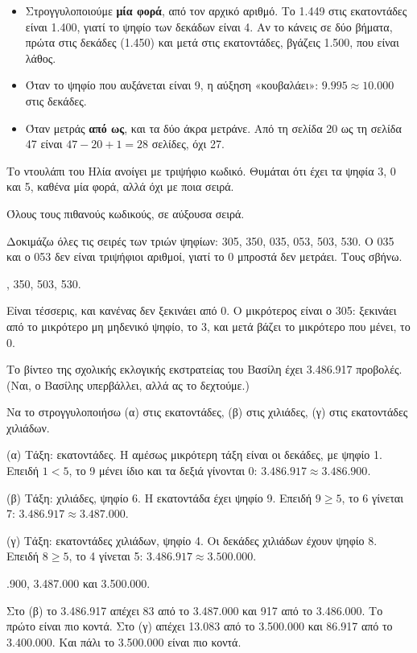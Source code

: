 \begin{prosoxi}
\begin{itemize}[leftmargin=1.2em,itemsep=0.3ex,topsep=2pt]
\item Στρογγυλοποιούμε \textbf{μία φορά}, από τον αρχικό αριθμό. Το 1.449 στις εκατοντάδες είναι 1.400, γιατί το ψηφίο των δεκάδων είναι 4. Αν το κάνεις σε δύο βήματα, πρώτα στις δεκάδες (1.450) και μετά στις εκατοντάδες, βγάζεις 1.500, που είναι λάθος.
\item Όταν το ψηφίο που αυξάνεται είναι 9, η αύξηση «κουβαλάει»: $9.995\approx 10.000$ στις δεκάδες.
\item Όταν μετράς \textbf{από ως}, και τα δύο άκρα μετράνε. Από τη σελίδα 20 ως τη σελίδα 47 είναι $47-20+1=28$ σελίδες, όχι 27.
\end{itemize}
\end{prosoxi}


\tixero Το ντουλάπι του Ηλία ανοίγει με τριψήφιο κωδικό. Θυμάται ότι έχει τα ψηφία 3, 0 και 5, καθένα μία φορά, αλλά όχι με ποια σειρά.\par
\tithelo Όλους τους πιθανούς κωδικούς, σε αύξουσα σειρά.\par
\possindeo Δοκιμάζω όλες τις σειρές των τριών ψηφίων: 305, 350, 035, 053, 503, 530. Ο 035 και ο 053 δεν είναι τριψήφιοι αριθμοί, γιατί το 0 μπροστά δεν μετράει. Τους σβήνω.\par
{}, 350, 503, 530.\par
\elegxos Είναι τέσσερις, και κανένας δεν ξεκινάει από 0. Ο μικρότερος είναι ο 305: ξεκινάει από το μικρότερο μη μηδενικό ψηφίο, το 3, και μετά βάζει το μικρότερο που μένει, το 0.

\tixero Το βίντεο της σχολικής εκλογικής εκστρατείας του Βασίλη έχει 3.486.917 προβολές. (Ναι, ο Βασίλης υπερβάλλει, αλλά ας το δεχτούμε.)\par
\tithelo Να το στρογγυλοποιήσω (α) στις εκατοντάδες, (β) στις χιλιάδες, (γ) στις εκατοντάδες χιλιάδων.\par
\possindeo
(α) Τάξη: εκατοντάδες. Η αμέσως μικρότερη τάξη είναι οι δεκάδες, με ψηφίο 1. Επειδή $1<5$, το 9 μένει ίδιο και τα δεξιά γίνονται 0: $3.486.917\approx 3.486.900$.\par
(β) Τάξη: χιλιάδες, ψηφίο 6. Η εκατοντάδα έχει ψηφίο 9. Επειδή $9\ge 5$, το 6 γίνεται 7: $3.486.917\approx 3.487.000$.\par
(γ) Τάξη: εκατοντάδες χιλιάδων, ψηφίο 4. Οι δεκάδες χιλιάδων έχουν ψηφίο 8. Επειδή $8\ge 5$, το 4 γίνεται 5: $3.486.917\approx 3.500.000$.\par
{}.900, 3.487.000 και 3.500.000.\par
\elegxos Στο (β) το 3.486.917 απέχει 83 από το 3.487.000 και 917 από το 3.486.000. Το πρώτο είναι πιο κοντά. Στο (γ) απέχει 13.083 από το 3.500.000 και 86.917 από το 3.400.000. Και πάλι το 3.500.000 είναι πιο κοντά.

